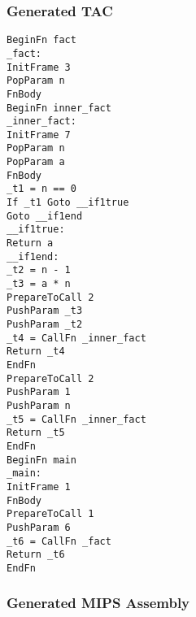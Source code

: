 \subsubsection{Generated TAC}
\begin{lstlisting}[showstringspaces=false,breaklines=true,backgroundcolor=\color{light-gray}, captionpos=b]
BeginFn fact
_fact:
InitFrame 3
PopParam n
FnBody
BeginFn inner_fact
_inner_fact:
InitFrame 7
PopParam n
PopParam a
FnBody
_t1 = n == 0
If _t1 Goto __if1true
Goto __if1end
__if1true:
Return a
__if1end:
_t2 = n - 1
_t3 = a * n
PrepareToCall 2
PushParam _t3
PushParam _t2
_t4 = CallFn _inner_fact
Return _t4
EndFn
PrepareToCall 2
PushParam 1
PushParam n
_t5 = CallFn _inner_fact
Return _t5
EndFn
BeginFn main
_main:
InitFrame 1
FnBody
PrepareToCall 1
PushParam 6
_t6 = CallFn _fact
Return _t6
EndFn

\end{lstlisting}\subsubsection{Generated MIPS Assembly}
